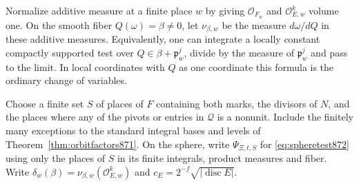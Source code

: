 \documentclass[a4paper,11pt]{article}
\theoremstyle{definition}
\theoremstyle{remark}
\numberwithin{equation}{section}
\begin{document}
Normalize additive measure at a finite place \(w\) by giving
\(\mathcal O_{F_w}\) and \(\mathcal O_{E,w}^k\) volume one. On
the smooth fiber \(Q(\omega)=\beta\ne0\), let \(\nu_{\beta,w}\)
be the measure \(d\omega/dQ\) in these additive measures.
Equivalently, one can integrate a locally constant compactly
supported test over \(Q\in\beta+\mathfrak p_w^j\), divide by
the measure of \(\mathfrak p_w^j\) and pass to the limit.
In local coordinates with \(Q\) as one coordinate this formula
is the ordinary change of variables.

Choose a finite set \(S\) of places of \(F\) containing both
marks, the divisors of \(N\), and the places where any of the
pivots or entries in \(\mathcal Q\) is a nonunit. Include the
finitely many exceptions to the standard integral bases and
levels of Theorem~\ref{thm:orbitfactors871}. On the sphere,
write \(\Psi_{\Xi,t,S}\) for \eqref{eq:spheretest872} using
only the places of \(S\) in its finite integrals, product
measures and fiber. Write
\(\delta_w(\beta)=\nu_{\beta,w}(\mathcal O_{E,w}^k)\) and
\(c_E=2^{-f}\sqrt{|\operatorname{disc}E|}\).
\end{document}
